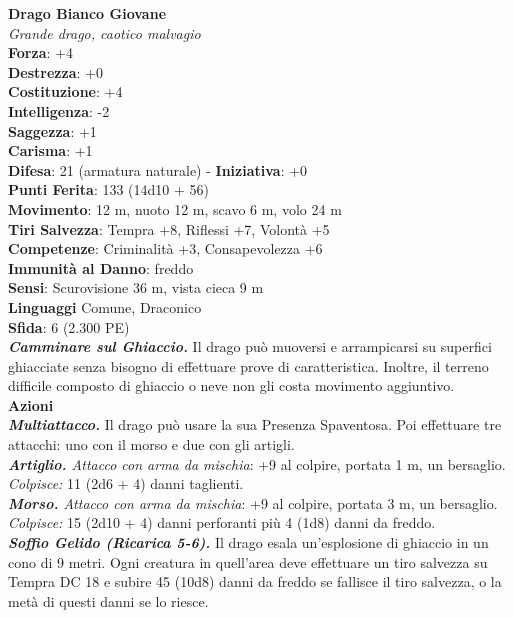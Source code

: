 \begin{multicols}{2}
\medskip\textbf{Drago Bianco Giovane}\\
\emph{Grande drago, caotico malvagio} \\
\textbf{Forza}: +4 \\
\textbf{Destrezza}: +0 \\
\textbf{Costituzione}: +4\\
\textbf{Intelligenza}: -2\\
\textbf{Saggezza}: +1\\
\textbf{Carisma}: +1\\
\textbf{Difesa}: 21 (armatura naturale) - \textbf{Iniziativa}: +0\\
\textbf{Punti Ferita}: 133 (14d10 + 56)\\
\textbf{Movimento}: 12 m, nuoto 12 m, scavo 6 m, volo 24 m\\
\textbf{Tiri Salvezza}: Tempra +8, Riflessi +7, Volontà +5\\
\textbf{Competenze}: Criminalità +3, Consapevolezza +6\\
\textbf{Immunità al Danno}: freddo\\
\textbf{Sensi}: Scurovisione 36 m, vista cieca 9 m\\
\textbf{Linguaggi} Comune, Draconico\\
\textbf{Sfida}: 6 (2.300 PE)\smallskip\\
\emph{\textbf{Camminare sul Ghiaccio.}} Il drago può muoversi e arrampicarsi su superfici ghiacciate senza bisogno di effettuare prove di caratteristica. Inoltre, il terreno difficile composto di ghiaccio o neve non gli costa movimento aggiuntivo.\\
\smallskip\textbf{Azioni}\\
\emph{\textbf{Multiattacco.}} Il drago può usare la sua Presenza Spaventosa. Poi effettuare tre attacchi: uno con il morso e due con gli artigli.\\
\emph{\textbf{Artiglio.} Attacco con arma da mischia}: +9 al colpire, portata 1 m, un bersaglio.\\
\emph{Colpisce:} 11 (2d6 + 4) danni taglienti.\\
\emph{\textbf{Morso.} Attacco con arma da mischia}: +9 al colpire, portata 3 m, un bersaglio.\\
\emph{Colpisce:} 15 (2d10 + 4) danni perforanti più 4 (1d8) danni da freddo.\\
\emph{\textbf{Soffio Gelido (Ricarica 5-6).}} Il drago esala un'esplosione di ghiaccio in un cono di 9 metri. Ogni creatura in quell'area deve effettuare un tiro salvezza su Tempra DC  18 e subire 45 (10d8) danni da freddo se fallisce il tiro salvezza, o la metà di questi danni se lo riesce.\\

\end{multicols}
